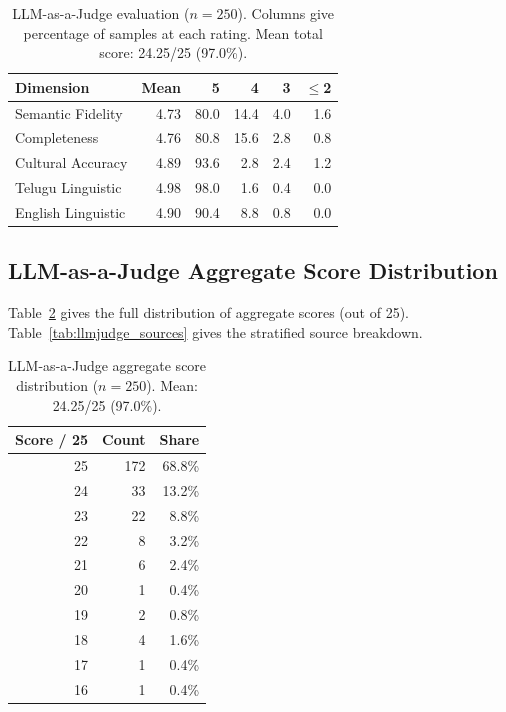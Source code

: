 \documentclass[11pt]{article}
\begin{document}
\begin{table}[H]
\centering
\small
\caption{LLM-as-a-Judge evaluation ($n=250$). Columns give percentage of
samples at each rating. Mean total score: 24.25/25 (97.0\%).}
\label{tab:llmjudge}
\begin{tabular}{lrrrrr}
\toprule
\textbf{Dimension} & \textbf{Mean} & \textbf{5} & \textbf{4}
    & \textbf{3} & \textbf{$\leq$2} \\
\midrule
Semantic Fidelity  & 4.73 & 80.0 & 14.4 & 4.0 & 1.6 \\
Completeness       & 4.76 & 80.8 & 15.6 & 2.8 & 0.8 \\
Cultural Accuracy  & 4.89 & 93.6 &  2.8 & 2.4 & 1.2 \\
Telugu Linguistic  & 4.98 & 98.0 &  1.6 & 0.4 & 0.0 \\
English Linguistic & 4.90 & 90.4 &  8.8 & 0.8 & 0.0 \\
\bottomrule
\end{tabular}
\end{table}

\subsection{LLM-as-a-Judge Aggregate Score Distribution}

Table~\ref{tab:llmjudge_full} gives the full distribution of aggregate scores
(out of 25). Table~\ref{tab:llmjudge_sources} gives the stratified source
breakdown.

\begin{table}[H]
\centering
\small
\caption{LLM-as-a-Judge aggregate score distribution ($n = 250$).
Mean: 24.25/25 (97.0\%).}
\label{tab:llmjudge_full}
\begin{tabular}{rrr}
\toprule
\textbf{Score / 25} & \textbf{Count} & \textbf{Share} \\
\midrule
25 & 172 & 68.8\% \\
24 &  33 & 13.2\% \\
23 &  22 &  8.8\% \\
22 &   8 &  3.2\% \\
21 &   6 &  2.4\% \\
20 &   1 &  0.4\% \\
19 &   2 &  0.8\% \\
18 &   4 &  1.6\% \\
17 &   1 &  0.4\% \\
16 &   1 &  0.4\% \\
\bottomrule
\end{tabular}
\end{table}
\end{document}
